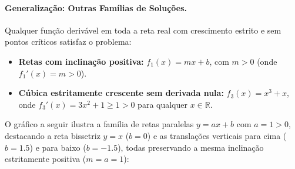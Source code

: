 \vspace{0.3cm}
\paragraph{Generalização: Outras Famílias de Soluções.}

Qualquer função derivável em toda a reta real com crescimento estrito e sem pontos críticos satisfaz o problema:
\begin{itemize}[noitemsep, topsep=2pt]
    \item \textbf{Retas com inclinação positiva:} $f_1(x) = mx + b$, com $m > 0$ (onde $f_1'(x) = m > 0$).
    \item \textbf{Cúbica estritamente crescente sem derivada nula:} $f_3(x) = x^3 + x$, onde $f_3'(x) = 3x^2 + 1 \ge 1 > 0$ para qualquer $x \in \mathbb{R}$.
\end{itemize}

\vspace{0.3cm}
O gráfico a seguir ilustra a família de retas paralelas $y = ax + b$ com $a = 1 > 0$, destacando a reta bissetriz $y = x$ ($b = 0$) e as translações verticais para cima ($b = 1.5$) e para baixo ($b = -1.5$), todas preservando a mesma inclinação estritamente positiva ($m = a = 1$):

